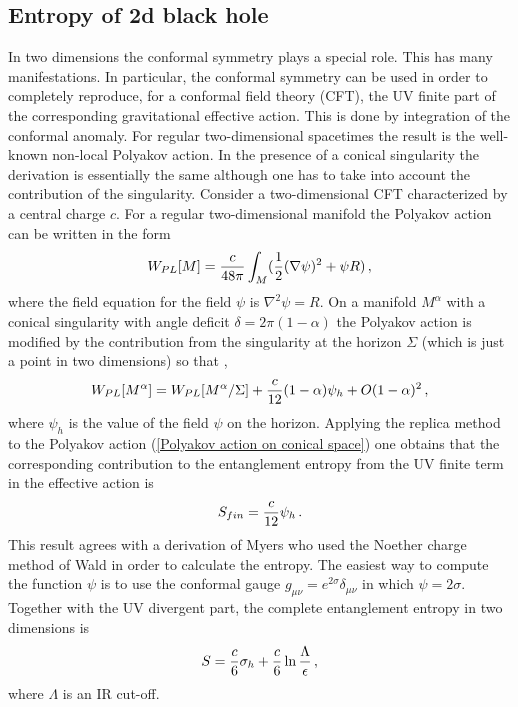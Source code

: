 \documentclass[12pt]{article}
\def\be{\begin{eqnarray}}
\def\ee{\end{eqnarray}}
\def\lb{\label}
\def\o{\over}
\begin{document}
\subsection{ Entropy of 2d black hole  }
In two dimensions the conformal symmetry plays a special role. This has many manifestations. In particular, the conformal symmetry can be used in order to
completely reproduce, for a conformal field theory (CFT), the UV finite part of the corresponding  gravitational effective action.  This is done by integration of the conformal anomaly. For regular two-dimensional spacetimes the  result is the well-known non-local Polyakov action. In the presence of a conical singularity the derivation is essentially the same 
although one has to take into account the contribution of the singularity. Consider a two-dimensional CFT characterized by a central charge $c$.  For a regular two-dimensional manifold the Polyakov action can be written in the form
\be
W_{PL}[M]={c\o 48\pi}\int_M({1\o 2}(\nabla\psi)^2+\psi R)\, ,
\lb{Polyakov action}
\ee
where the field equation for the field $\psi$ is $\nabla^2\psi=R$. On a manifold $M^\alpha$ with a conical singularity with angle deficit $\delta=2\pi(1-\alpha)$
the Polyakov action is modified by the contribution from the singularity at the horizon $\Sigma$  (which is just a point in two dimensions) so that \cite{Solodukhin:1994yz}, \cite{Fursaev:1994ea}
\be
W_{PL}[M^\alpha]=W_{PL}[M^\alpha / \Sigma]+{c\o 12}(1-\alpha)\psi_h +O(1-\alpha)^2\, ,
\lb{Polyakov action on conical space}
\ee
where $\psi_h$ is the value of the field $\psi$ on the horizon. Applying the replica method to the Polyakov action (\ref{Polyakov action on conical space}) one obtains that the corresponding contribution to the entanglement entropy from the UV finite term in the effective action is 
\be
S_{fin}={c\o 12}\psi_h\, .
\lb{finite entropy}
\ee
This result agrees with a derivation of Myers \cite{Myers:1994sg} who used the  Noether charge method of Wald \cite{Wald:1993nt} in order to calculate the entropy. The easiest way to compute the function $\psi$ is to use the conformal gauge 
$g_{\mu\nu}=e^{2\sigma}\delta_{\mu\nu}$ in which $\psi=2\sigma$. Together with the UV divergent part, the complete entanglement entropy in two dimensions is
\be
S={c\o 6}\sigma_h+{c\o 6}\ln{\Lambda\o \epsilon}\, ,
\lb{complete entropy}
\ee
where $\Lambda$ is an IR cut-off.
\end{document}
